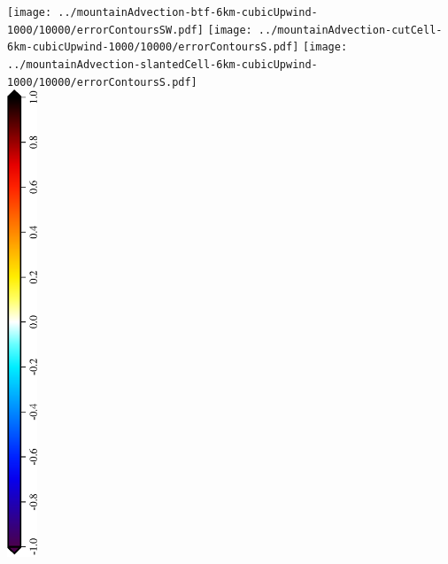 \documentclass{article}
\begin{document}
\texttt{[image: ../mountainAdvection-btf-6km-cubicUpwind-1000/10000/errorContoursSW.pdf]}
\texttt{[image: ../mountainAdvection-cutCell-6km-cubicUpwind-1000/10000/errorContoursS.pdf]}
\texttt{[image: ../mountainAdvection-slantedCell-6km-cubicUpwind-1000/10000/errorContoursS.pdf]} \\
\centering
\includegraphics[height=5.5in,angle=270]{mountainAdvectionErrorLegend.eps}
\end{document}
